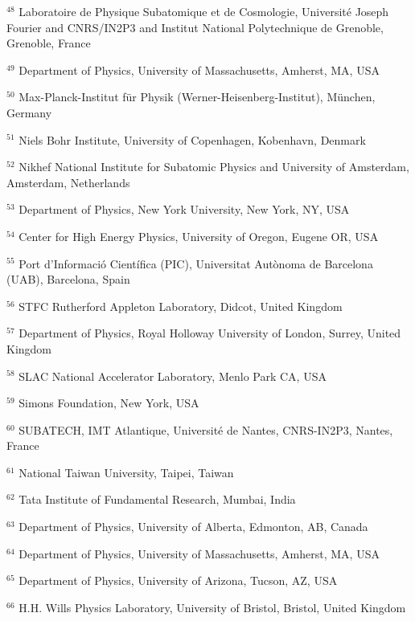 \par {\footnotesize $^{48}$ Laboratoire de Physique Subatomique et de Cosmologie, Université Joseph Fourier and CNRS/IN2P3 and Institut National Polytechnique de Grenoble, Grenoble, France}
\par {\footnotesize $^{49}$ Department of Physics, University of Massachusetts, Amherst, MA, USA}
\par {\footnotesize $^{50}$ Max-Planck-Institut für Physik (Werner-Heisenberg-Institut), München, Germany}
\par {\footnotesize $^{51}$ Niels Bohr Institute, University of Copenhagen, Kobenhavn, Denmark}
\par {\footnotesize $^{52}$ Nikhef National Institute for Subatomic Physics and University of Amsterdam, Amsterdam, Netherlands}
\par {\footnotesize $^{53}$ Department of Physics, New York University, New York, NY, USA}
\par {\footnotesize $^{54}$ Center for High Energy Physics, University of Oregon, Eugene OR, USA}
\par {\footnotesize $^{55}$ Port d’Informació Científica (PIC), Universitat Autònoma de Barcelona (UAB), Barcelona, Spain}
\par {\footnotesize $^{56}$ STFC Rutherford Appleton Laboratory, Didcot, United Kingdom}
\par {\footnotesize $^{57}$ Department of Physics, Royal Holloway University of London, Surrey, United Kingdom}
\par {\footnotesize $^{58}$ SLAC National Accelerator Laboratory, Menlo Park CA, USA}
\par {\footnotesize $^{59}$ Simons Foundation, New York, USA}
\par {\footnotesize $^{60}$ SUBATECH, IMT Atlantique, Université de Nantes, CNRS-IN2P3, Nantes, France}
\par {\footnotesize $^{61}$ National Taiwan University, Taipei, Taiwan}
\par {\footnotesize $^{62}$ Tata Institute of Fundamental Research, Mumbai, India}
\par {\footnotesize $^{63}$ Department of Physics, University of Alberta, Edmonton, AB, Canada}
\par {\footnotesize $^{64}$ Department of Physics, University of Massachusetts, Amherst, MA, USA}
\par {\footnotesize $^{65}$ Department of Physics, University of Arizona, Tucson, AZ, USA}
\par {\footnotesize $^{66}$ H.H. Wills Physics Laboratory, University of Bristol, Bristol, United Kingdom}

